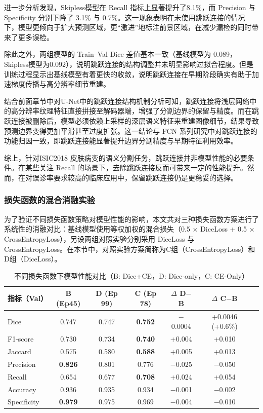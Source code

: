 进一步分析发现，Skipless模型在 Recall 指标上显著提升了8.1\%，而 Precision 与 Specificity 分别下降了 3.1\% 与 0.7\%。这一现象表明在未使用跳跃连接的情况下，模型更倾向于扩大预测区域，更“激进”地标注前景区域，在减少漏检的同时带来了更多误检。

除此之外，两组模型的 Train–Val Dice 差值基本一致（基线模型为 0.089，Skipless模型为0.092），说明跳跃连接的结构调整并未明显影响过拟合程度。但是训练过程显示出基线模型有着更快的收敛，说明跳跃连接在早期阶段确实有助于加速梯度传播与高分辨率细节重建。

结合前面章节中对U-Net中的跳跃连接结构机制分析可知，跳跃连接将浅层网络中的高分辨率纹理特征直接拼接至解码器端，增强了分割边界的保留与精度。而在跳跃连接被删除后，模型必须依赖上采样的深层语义特征来重建图像细节，结果导致预测边界变得更加平滑甚至过度扩张。这一结论与 FCN 系列研究中对跳跃连接的功能归因一致，即跳跃连接能显著提升边界分割精度与早期特征利用效率\cite{milletari2016}。

综上，针对ISIC2018 皮肤病变的语义分割任务，跳跃连接并非模型性能的必要条件。在某些关注 Recall 的场景下，去除跳跃连接反而可带来一定的性能提升。然而，在对误诊率要求较高的临床应用中，保留跳跃连接仍是更稳妥的选择。

\subsubsection{损失函数的混合消融实验}

为了验证不同损失函数策略对模型性能的影响，本文共对三种损失函数方案进行了系统性的消融对比：基线模型使用等权加权的混合损失（0.5 × DiceLoss + 0.5 × CrossEntropyLoss），另设两组对照实验分别采用 DiceLoss 与 CrossEntropyLoss。在本节中，对照实验方案简称为C组（CrossEntropyLoss）和D组（DiceLoss）。

\begin{table}[htbp]
    \centering
    \caption{不同损失函数下模型性能对比（B: Dice+CE，D: Dice-only，C: CE-Only）}
    \label{tab:loss_ablation}
    \begin{tabular}{lcccccc}
        \toprule
        指标（Val） & B (Ep45) & D (Ep 99) & C (Ep 78) & $\Delta$ D$-$B & $\Delta$ C$-$B \\
        \midrule
        Dice        & 0.747 & 0.747 & \textbf{0.752} & $-$0.0004 & +0.0046 (+0.6\%) \\
        F1-score    & 0.730 & 0.734 & \textbf{0.740} & +0.004 & +0.010 \\
        Jaccard     & 0.575 & 0.580 & \textbf{0.588} & +0.005 & +0.013 \\
        Precision   & \textbf{0.826} & 0.801 & 0.776 & $-$0.025 & $-$0.050 \\
        Recall      & 0.654 & 0.677 & \textbf{0.708} & +0.024 & +0.054 \\
        Accuracy    & 0.936 & 0.935 & 0.934 & $-$0.001 & $-$0.002 \\
        Specificity & \textbf{0.979} & 0.975 & 0.969 & $-$0.004 & $-$0.010 \\
        \bottomrule
    \end{tabular}
\end{table}


